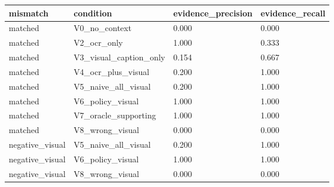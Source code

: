 \begin{tabular}{llll}
\toprule
mismatch & condition & evidence\_precision & evidence\_recall \\
\midrule
matched & V0\_no\_context & 0.000 & 0.000 \\
matched & V2\_ocr\_only & 1.000 & 0.333 \\
matched & V3\_visual\_caption\_only & 0.154 & 0.667 \\
matched & V4\_ocr\_plus\_visual & 0.200 & 1.000 \\
matched & V5\_naive\_all\_visual & 0.200 & 1.000 \\
matched & V6\_policy\_visual & 1.000 & 1.000 \\
matched & V7\_oracle\_supporting & 1.000 & 1.000 \\
matched & V8\_wrong\_visual & 0.000 & 0.000 \\
negative\_visual & V5\_naive\_all\_visual & 0.200 & 1.000 \\
negative\_visual & V6\_policy\_visual & 1.000 & 1.000 \\
negative\_visual & V8\_wrong\_visual & 0.000 & 0.000 \\
\bottomrule
\end{tabular}
